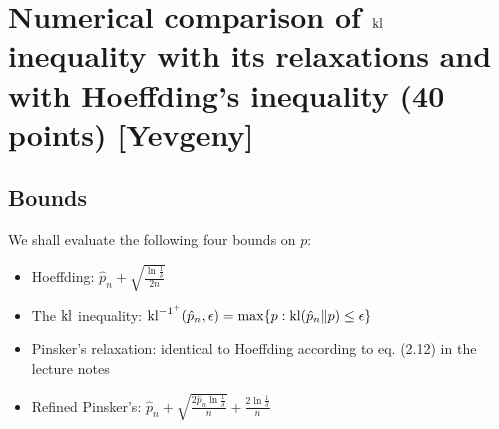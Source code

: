 \section{Numerical comparison of \texorpdfstring{$\operatorname{kl}$}{kl} inequality with its relaxations and with Hoeffding's inequality (40 points) [Yevgeny]}

\subsection*{Bounds}
We shall evaluate the following four bounds on $p$:

\begin{itemize}
    \item Hoeffding: $\hat{p}_n + \sqrt{\frac{\ln \frac{1}{\delta}}{2n}}$
    \item The $\operatorname{kl}$ inequality: $\operatorname{kl}^{-1^+} (\hat{p}_n, \epsilon) = \max \{ p : \mathrm{kl} (\hat{p}_n\|p) \leq \epsilon \}$
    \item Pinsker’s relaxation: identical to Hoeffding according to eq. (2.12) in the lecture notes
    \item Reﬁned Pinsker’s: $\hat{p}_n + \sqrt{\frac{2\hat{p}_n\ln \frac{1}{\delta} }{n}} + \frac{2\ln \frac{1}{\delta} }{n} $
\end{itemize}

